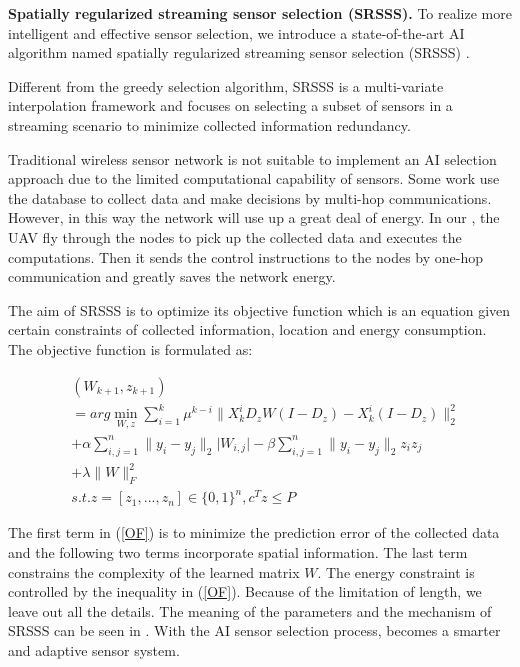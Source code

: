 \textbf{Spatially regularized streaming sensor selection (SRSSS).} 
To realize more intelligent and effective sensor selection, we introduce 
a state-of-the-art AI algorithm named spatially regularized streaming 
sensor selection (SRSSS) \cite{li2016spatially}.

Different from the greedy selection algorithm, SRSSS is a multi-variate 
interpolation framework and focuses on selecting a subset
of sensors in a streaming scenario to minimize collected information redundancy.  

Traditional wireless sensor network is not suitable to implement an AI selection approach
due to the limited computational capability of sensors. Some work use the database to collect data
and make decisions by multi-hop communications. However, in this way the network will use up a great deal of energy.
In our {\sdn}, the UAV fly through the nodes to pick up the collected data and executes the computations.
Then it sends the control instructions to the nodes by one-hop communication and greatly saves the network energy.

The aim of SRSSS is to optimize its objective function which is an equation given
certain constraints of collected information, location and energy consumption.
The objective function is formulated as:

\begin{equation}
\label{OF}
\begin{aligned}
& (W_{k+1},z_{k+1})  \\
& = arg \min_{W,z} \sum_{i=1}^k \mu^{k-i}\lVert X_k^iD_zW(I-D_z)-X_k^i(I-D_z)\rVert^2_2 \\
& + \alpha\sum_{i,j=1}^n\lVert y_i-y_j\rVert_2\lvert W_{i,j} \rvert - \beta\sum_{i,j=1}^n\lVert y_i-y_j\rVert_2 z_iz_j \\
& + \lambda\lVert W \rVert^2_F \\
&s.t. z = [z_1,...,z_n] \in {\{0,1\}}^n, c^Tz \leq P
\end{aligned}
\end{equation}

The first term in (\ref{OF}) is to minimize the prediction error of the collected data
and the following two terms incorporate spatial information. The last term constrains
the complexity of the learned matrix $W$. The energy constraint is controlled by 
the inequality in (\ref{OF}). Because of the limitation of length,  we leave out all the details. 
The meaning of the parameters and the mechanism of 
SRSSS can be seen in \cite{li2016spatially}. With the AI sensor selection process, 
{\sdn} becomes a smarter and adaptive sensor system. 






